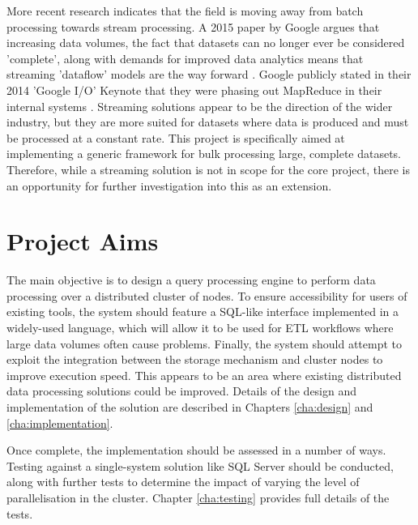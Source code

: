More recent research indicates that the field is moving away from batch processing towards stream processing. A 2015 paper by Google argues that increasing data volumes, the fact that datasets can no longer ever be considered 'complete', along with demands for improved data analytics means that streaming 'dataflow' models are the way forward  \cite{akidau2015dataflow}. Google publicly stated in their 2014 'Google I/O' Keynote that they were phasing out MapReduce in their internal systems \cite{googleio2014}. 
Streaming solutions appear to be the direction of the wider industry, but they are more suited for datasets where data is produced and must be processed at a constant rate. This project is specifically aimed at implementing a generic framework for bulk processing large, complete datasets. Therefore, while a streaming solution is not in scope for the core project, there is an opportunity for further investigation into this as an extension.

\section{Project Aims}
The main objective is to design a query processing engine to perform data processing over a distributed cluster of nodes. To ensure accessibility for users of existing tools, the system should feature a SQL-like interface implemented in a widely-used language, which will allow it to be used for ETL workflows where large data volumes often cause problems. Finally, the system should attempt to exploit the integration between the storage mechanism and cluster nodes to improve execution speed. This appears to be an area where existing distributed data processing solutions could be improved. Details of the design and implementation of the solution are described in Chapters \ref{cha:design} and \ref{cha:implementation}.

Once complete, the implementation should be assessed in a number of ways. Testing against a single-system solution like SQL Server should be conducted, along with further tests to determine the impact of varying the level of parallelisation in the cluster. Chapter \ref{cha:testing} provides full details of the tests.

